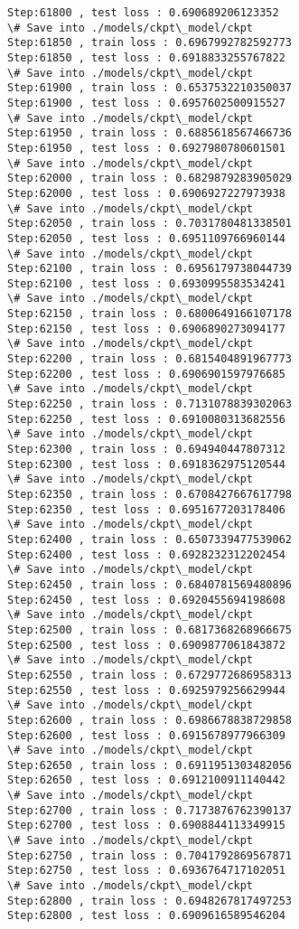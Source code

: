 \documentclass[11pt]{article}
\begin{document}
\begin{Verbatim}[commandchars=\\\{\}]
Step:61800 , test loss : 0.690689206123352
\# Save into ./models/ckpt\_model/ckpt
Step:61850 , train loss : 0.6967992782592773
Step:61850 , test loss : 0.6918833255767822
\# Save into ./models/ckpt\_model/ckpt
Step:61900 , train loss : 0.6537532210350037
Step:61900 , test loss : 0.6957602500915527
\# Save into ./models/ckpt\_model/ckpt
Step:61950 , train loss : 0.6885618567466736
Step:61950 , test loss : 0.6927980780601501
\# Save into ./models/ckpt\_model/ckpt
Step:62000 , train loss : 0.6829879283905029
Step:62000 , test loss : 0.6906927227973938
\# Save into ./models/ckpt\_model/ckpt
Step:62050 , train loss : 0.7031780481338501
Step:62050 , test loss : 0.6951109766960144
\# Save into ./models/ckpt\_model/ckpt
Step:62100 , train loss : 0.6956179738044739
Step:62100 , test loss : 0.6930995583534241
\# Save into ./models/ckpt\_model/ckpt
Step:62150 , train loss : 0.6800649166107178
Step:62150 , test loss : 0.6906890273094177
\# Save into ./models/ckpt\_model/ckpt
Step:62200 , train loss : 0.6815404891967773
Step:62200 , test loss : 0.6906901597976685
\# Save into ./models/ckpt\_model/ckpt
Step:62250 , train loss : 0.7131078839302063
Step:62250 , test loss : 0.6910080313682556
\# Save into ./models/ckpt\_model/ckpt
Step:62300 , train loss : 0.694940447807312
Step:62300 , test loss : 0.6918362975120544
\# Save into ./models/ckpt\_model/ckpt
Step:62350 , train loss : 0.6708427667617798
Step:62350 , test loss : 0.6951677203178406
\# Save into ./models/ckpt\_model/ckpt
Step:62400 , train loss : 0.6507339477539062
Step:62400 , test loss : 0.6928232312202454
\# Save into ./models/ckpt\_model/ckpt
Step:62450 , train loss : 0.6840781569480896
Step:62450 , test loss : 0.6920455694198608
\# Save into ./models/ckpt\_model/ckpt
Step:62500 , train loss : 0.6817368268966675
Step:62500 , test loss : 0.6909877061843872
\# Save into ./models/ckpt\_model/ckpt
Step:62550 , train loss : 0.6729772686958313
Step:62550 , test loss : 0.6925979256629944
\# Save into ./models/ckpt\_model/ckpt
Step:62600 , train loss : 0.6986678838729858
Step:62600 , test loss : 0.6915678977966309
\# Save into ./models/ckpt\_model/ckpt
Step:62650 , train loss : 0.6911951303482056
Step:62650 , test loss : 0.6912100911140442
\# Save into ./models/ckpt\_model/ckpt
Step:62700 , train loss : 0.7173876762390137
Step:62700 , test loss : 0.6908844113349915
\# Save into ./models/ckpt\_model/ckpt
Step:62750 , train loss : 0.7041792869567871
Step:62750 , test loss : 0.6936764717102051
\# Save into ./models/ckpt\_model/ckpt
Step:62800 , train loss : 0.6948267817497253
Step:62800 , test loss : 0.6909616589546204

\end{Verbatim}
\end{document}
